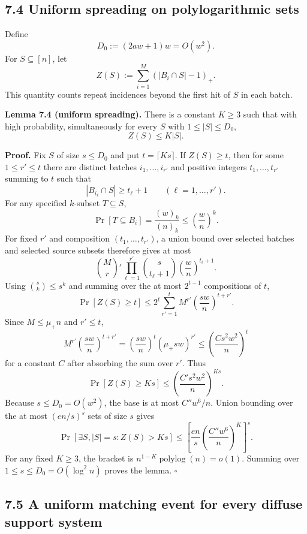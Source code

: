 \documentclass[
]{article}
\begin{document}
\hypertarget{uniform-spreading-on-polylogarithmic-sets}{%
\subsection{7.4 Uniform spreading on polylogarithmic
sets}\label{uniform-spreading-on-polylogarithmic-sets}}

Define \[
D_0:=(2aw+1)w=O(w^2).
\] For \(S\subseteq[n]\), let \[
Z(S):=\sum_{i=1}^M(|B_i\cap S|-1)_+.
\] This quantity counts repeat incidences beyond the first hit of \(S\)
in each batch.

\textbf{Lemma 7.4 (uniform spreading).} There is a constant \(K\ge3\)
such that with high probability, simultaneously for every \(S\) with
\(1\le|S|\le D_0\), \[
\boxed{Z(S)\le K|S|.}
\]

\textbf{Proof.} Fix \(S\) of size \(s\le D_0\) and put
\(t=\lceil Ks\rceil\). If \(Z(S)\ge t\), then for some \(1\le r'\le t\)
there are distinct batches \(i_1,\ldots,i_{r'}\) and positive integers
\(t_1,\ldots,t_{r'}\) summing to \(t\) such that \[
|B_{i_\ell}\cap S|\ge t_\ell+1
\qquad(\ell=1,\ldots,r').
\] For any specified \(k\)-subset \(T\subseteq S\), \[
\Pr[T\subseteq B_i]
=
\frac{(w)_k}{(n)_k}
\le
\left(\frac wn\right)^k.
\] For fixed \(r'\) and composition \((t_1,\ldots,t_{r'})\), a union
bound over selected batches and selected source subsets therefore gives
at most \[
\binom Mr'
\prod_{\ell=1}^{r'}
\binom{s}{t_\ell+1}
\left(\frac wn\right)^{t_\ell+1}.
\] Using \(\binom{s}{k}\le s^k\) and summing over the at most
\(2^{t-1}\) compositions of \(t\), \[
\Pr[Z(S)\ge t]
\le
2^t\sum_{r'=1}^t
M^{r'}
\left(\frac{sw}{n}\right)^{t+r'}.
\] Since \(M\le\mu_+n\) and \(r'\le t\), \[
M^{r'}\left(\frac{sw}{n}\right)^{t+r'}
=
\left(\frac{sw}{n}\right)^t(\mu_+sw)^{r'}
\le
\left(\frac{C s^2w^2}{n}\right)^t
\] for a constant \(C\) after absorbing the sum over \(r'\). Thus \[
\Pr[Z(S)\ge Ks]
\le
\left(\frac{C' s^2w^2}{n}\right)^{Ks}.
\] Because \(s\le D_0=O(w^2)\), the base is at most \(C''w^6/n\). Union
bounding over the at most \((en/s)^s\) sets of size \(s\) gives \[
\Pr[\exists S,|S|=s:Z(S)>Ks]
\le
\left[
\frac{en}{s}
\left(\frac{C''w^6}{n}\right)^K
\right]^s.
\] For any fixed \(K\ge3\), the bracket is
\(n^{1-K}\operatorname{polylog}(n)=o(1)\). Summing over
\(1\le s\le D_0=O(\log^2n)\) proves the lemma. \(\square\)

\hypertarget{a-uniform-matching-event-for-every-diffuse-support-system}{%
\subsection{7.5 A uniform matching event for every diffuse support
system}\label{a-uniform-matching-event-for-every-diffuse-support-system}}
\end{document}
